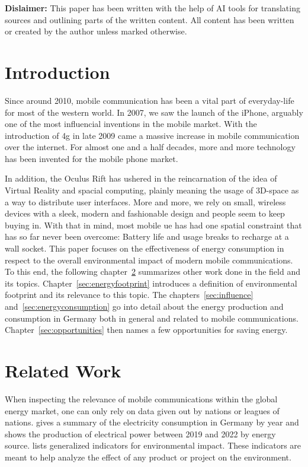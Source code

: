 \documentclass[11pt,a4paper]{article}
\begin{document}
\noindent\textbf{Dislaimer:} This paper has been written with the help of AI tools for translating sources and outlining parts of the written content.
All content has been written or created by the author unless marked otherwise.

\tableofcontents

\section{Introduction}\label{sec:intro}
Since around 2010, mobile communication has been a vital part of everyday-life for most of the western world.
In 2007, we saw the launch of the iPhone, arguably one of the most influencial inventions in the mobile market.
With the introduction of \acrfull{4g} in late 2009 came a massive increase in mobile communication over the internet.
For almost one and a half decades, more and more technology has been invented for the mobile phone market.

In addition, the Oculus Rift has ushered in the reincarnation of the idea of Virtual Reality and spacial computing, plainly meaning the usage of 3D-space as a way to distribute user interfaces.
More and more, we rely on small, wireless devices with a sleek, modern and fashionable design and people seem to keep buying in. 
With that in mind, most mobile \acrfull{ue} has had one spatial constraint that has so far never been overcome: Battery life and usage breaks to recharge at a wall socket.
This paper focuses on the effectiveness of energy consumption in respect to the overall environmental impact of modern mobile communications.
To this end, the following chapter~\ref{sec:relatedwork} summarizes other work done in the field and its topics.
Chapter~\ref{sec:energyfootprint} introduces a definition of environmental footprint and its relevance to this topic.
The chapters~\ref{sec:influence} and~\ref{sec:energyconsumption} go into detail about the energy production and consumption in Germany both in general and related to mobile communications.
Chapter~\ref{sec:opportunities} then names a few opportunities for saving energy.

\section{Related Work}\label{sec:relatedwork}

When inspecting the relevance of mobile communications within the global energy market, one can only rely on data given out by nations or leagues of nations.
\citep{Stromverbrauch} gives a summary of the electricity consumption in Germany by year and \citep{Bruttostromerzeugung} shows the production of electrical power between 2019 and 2022 by energy source.
\citep{Umweltindikatoren} lists generalized indicators for environmental impact.
These indicators are meant to help analyze the effect of any product or project on the environment.
\end{document}
